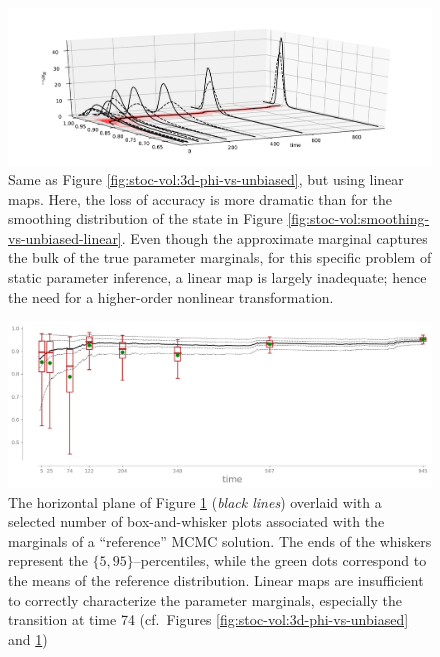 \documentclass[twoside,11pt]{article}
\begin{document}
\begin{figure}[H]
  \centering
  \includegraphics[width=1.0\textwidth, bb=65bp 20bp 775bp 280bp, clip]{o1-filtering-marginals-timesteps_phi-3d.pdf}
  \caption{
    Same as Figure \ref{fig:stoc-vol:3d-phi-vs-unbiased}, but using
    linear maps. Here, the loss of accuracy is more dramatic than for
    the smoothing distribution of the state in
    Figure \ref{fig:stoc-vol:smoothing-vs-unbiased-linear}.
    Even though the approximate marginal captures the bulk of the
    true parameter marginals, for this specific
    problem of static parameter inference, a linear map is largely
    inadequate; hence the need for a higher-order  nonlinear transformation.
  }
  \label{fig:stoc-vol:3d-phi-vs-unbiased-linear}
\end{figure}

\begin{figure}[H]
  \centering
  \includegraphics[width=1.0\textwidth, bb=0bp 0bp 925bp 355bp, clip]{filtering-marginals-timesteps_phi-boxplot.pdf}
  \caption{The horizontal plane of 
  Figure \ref{fig:stoc-vol:3d-phi-vs-unbiased-linear} ({\it black lines})
  overlaid with a selected number of box-and-whisker plots 
   associated with the marginals of a ``reference'' MCMC solution.
  The ends of the whiskers represent the $\{5,95\}$--percentiles, while the green dots correspond to the means of the reference
  distribution. 
  Linear maps are insufficient to correctly characterize the
  parameter marginals, especially the transition at time 74 (cf.\ Figures \ref{fig:stoc-vol:3d-phi-vs-unbiased} and 
  \ref{fig:stoc-vol:3d-phi-vs-unbiased-linear})
  \label{fig:stoc-vol:2d-phi-vs-unbiased-linear}
  }
\end{figure}
\end{document}
